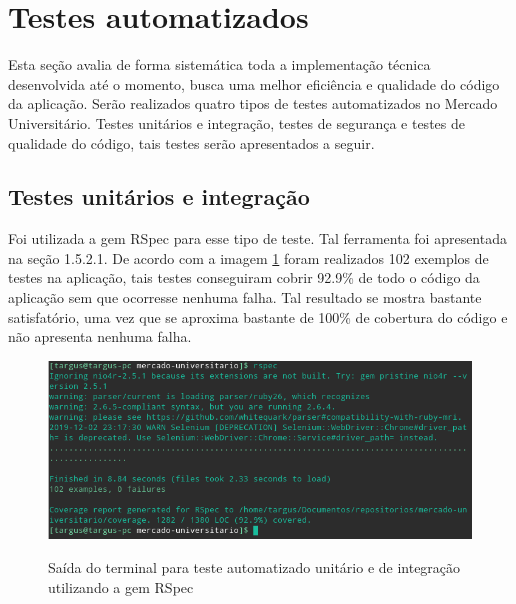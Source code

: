 \section{Testes automatizados}
Esta seção avalia de forma sistemática toda a implementação técnica desenvolvida até o momento, busca uma melhor eficiência e qualidade do código da aplicação. Serão realizados quatro tipos de testes automatizados no Mercado Universitário. Testes unitários e integração, testes de segurança e testes de qualidade do código, tais testes serão apresentados a seguir.
\subsection{Testes unitários e integração}
Foi utilizada a gem RSpec para esse tipo de teste. Tal ferramenta foi apresentada na seção 1.5.2.1. De acordo com a imagem \ref{fig:rspec} foram realizados 102 exemplos de testes na aplicação, tais testes conseguiram cobrir 92.9\% de todo o código da aplicação sem que ocorresse nenhuma falha. Tal resultado se mostra bastante satisfatório, uma vez que se aproxima bastante de 100\% de cobertura do código e não apresenta nenhuma falha.
\begin{figure}[htbp!]
  \centering
  \caption{Saída do terminal para teste automatizado unitário e de integração utilizando a gem RSpec}
  \includegraphics[width=1\textwidth]{figs/rspec.png}
    \label{fig:rspec}
\end{figure}
